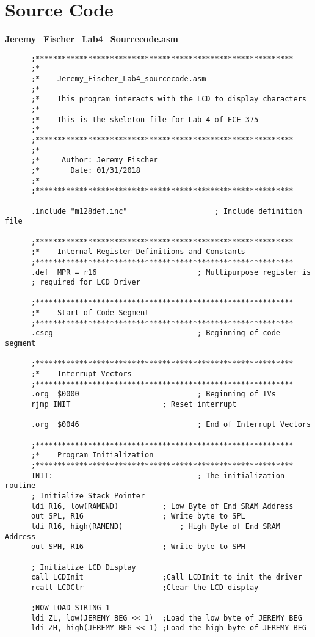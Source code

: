 \documentclass[12pt,letterpaper]{article}
\begin{document}
\section{Source Code}
	\textbf{Jeremy\_Fischer\_Lab4\_Sourcecode.asm}
    \begin{verbatim}
      ;***********************************************************
      ;*
      ;*	Jeremy_Fischer_Lab4_sourcecode.asm
      ;*
      ;*	This program interacts with the LCD to display characters
      ;*
      ;*	This is the skeleton file for Lab 4 of ECE 375
      ;*
      ;***********************************************************
      ;*
      ;*	 Author: Jeremy Fischer
      ;*	   Date: 01/31/2018
      ;*
      ;***********************************************************
      
      .include "m128def.inc"					; Include definition file
      
      ;***********************************************************
      ;*	Internal Register Definitions and Constants
      ;***********************************************************
      .def	MPR = r16						; Multipurpose register is
      ; required for LCD Driver
      
      ;***********************************************************
      ;*	Start of Code Segment
      ;***********************************************************
      .cseg									; Beginning of code segment
      
      ;***********************************************************
      ;*	Interrupt Vectors
      ;***********************************************************
      .org	$0000							; Beginning of IVs
      rjmp INIT						; Reset interrupt
      
      .org	$0046							; End of Interrupt Vectors
      
      ;***********************************************************
      ;*	Program Initialization
      ;***********************************************************
      INIT:									; The initialization routine
      ; Initialize Stack Pointer
      ldi R16, low(RAMEND) 			; Low Byte of End SRAM Address
      out SPL, R16 					; Write byte to SPL
      ldi R16, high(RAMEND) 			; High Byte of End SRAM Address
      out SPH, R16 					; Write byte to SPH
      
      ; Initialize LCD Display
      call LCDInit					;Call LCDInit to init the driver
      rcall LCDClr					;Clear the LCD display
      
      ;NOW LOAD STRING 1
      ldi ZL, low(JEREMY_BEG << 1) 	;Load the low byte of JEREMY_BEG
      ldi ZH, high(JEREMY_BEG << 1)	;Load the high byte of JEREMY_BEG
      

\end{verbatim}
\end{document}
